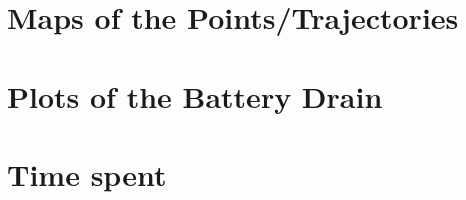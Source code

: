 \documentclass{lab}
\begin{document}
\section{Maps of the Points/Trajectories}

\section{Plots of the Battery Drain}

\section{Time spent}
\end{document}
